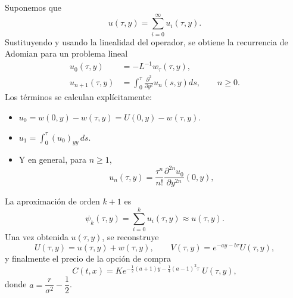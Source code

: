 \documentclass[12pt]{article}
\begin{document}
\begin{enumerate}
\begin{enumerate}[(a)]
            Suponemos que
            \[ u(\tau,y) = \sum_{i=0}^\infty u_i(\tau,y). \]
            Sustituyendo y usando la linealidad del operador, se obtiene
            la recurrencia de Adomian para un problema lineal
            \begin{align}
                u_0(\tau,y) &= -L^{-1}w_\tau(\tau,y),\\
                u_{n+1}(\tau,y) &= \int_0^\tau \frac{\partial^2}{\partial y^2}
                u_n(s,y)ds, \qquad n\ge 0.
            \end{align}
            Los términos se calculan explícitamente:
            \begin{itemize}
                \item $u_0 = w(0,y)-w(\tau,y) = U(0,y)-w(\tau,y)$.
                \item $u_1 = \int_0^\tau (u_0)_{yy}\,ds$.
                \item Y en general, para $n\ge 1$,
                \[ u_n(\tau,y) = \frac{\tau^n}{n!}
                \frac{\partial^{2n} u_0}{\partial y^{2n}}(0,y), \]
            \end{itemize}
            La aproximación de orden $k+1$ es
            \[ \psi_k(\tau,y) = \sum_{i=0}^{k} u_i(\tau,y) \approx u(\tau,y). \]
            Una vez obtenida $u(\tau,y)$, se reconstruye
            \[ U(\tau,y) = u(\tau,y) + w(\tau,y),\qquad V(\tau,y)
            = e^{-a y - b\tau} U(\tau,y), \]
            y finalmente el precio de la opción de compra
            \[ C(t,x) = K e^{-\frac{1}{2}(a+1)y - \frac{1}{4}(a-1)^2\tau}
            \;U(\tau,y), \]
            donde  $a = \dfrac{r}{\sigma^2}-\dfrac{1}{2}$.



\end{enumerate}
\end{enumerate}
\end{document}
